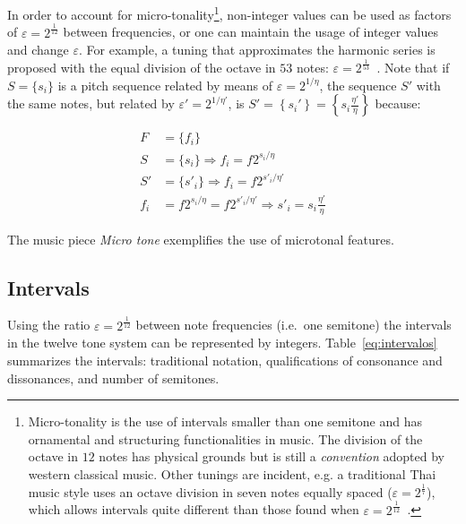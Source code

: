 \documentclass[format=acmsmall, review=false, screen=true]{acmart}
\begin{document}
In order to account for micro-tonality\footnote{Micro-tonality is the use of intervals smaller
than one semitone and has ornamental and structuring functionalities in music. The division of the octave in $12$ notes has physical grounds but is still a \emph{convention} adopted by western classical music. Other tunings are incident, e.g. a traditional Thai music style uses an octave division in seven notes equally spaced ($\varepsilon=2^{\frac{1}{7}}$),
which allows intervals quite different than those found when $\varepsilon=2^{\frac{1}{12}}$~\cite{Wisnick}.}, non-integer values can be used as factors of $\varepsilon=2^{\frac{1}{12}}$ between frequencies, or one can maintain the usage of integer values and change $\varepsilon$. For example, a tuning that approximates the harmonic series
is proposed with the equal division of the octave in $53$ notes:
$\varepsilon=2^{\frac{1}{53}}$~\cite{microtonalidade}.
Note that if $S=\{s_i\}$ is a pitch sequence related by means of $\varepsilon=2^{1/\eta}$, the sequence $S'$ with the same notes, but related by $\varepsilon'=2^{1/\eta'}$, is 
$S'=\left\{s_i'\right\}=\left\{
s_i \frac{\eta'}{\eta}\right\}$ because:

\begin{equation}\label{eq:micro}
\begin{split}
    F   & = \{f_i\}\\
    S   & = \{s_i\} \Rightarrow f_i = f 2^{s_i/\eta}\\
    S'  & = \{s'_i\} \Rightarrow f_i = f 2^{s'_i/\eta'}\\
    f_i & =  f 2^{s_i/\eta} = f 2^{s'_i/\eta'} \Rightarrow s'_i = s_i\frac{\eta'}{\eta} 
\end{split}
\end{equation}

The music piece \emph{Micro
tone} exemplifies the use of microtonal features.

\subsection{Intervals}\label{subsec:intervalos}
Using the ratio $\varepsilon=2^{\frac{1}{12}}$ between note frequencies (i.e.\ one semitone)
the intervals in the twelve tone system can be represented by integers. Table~\ref{eq:intervalos} summarizes the intervals: traditional notation, qualifications of consonance and
dissonances, and number of semitones.
\end{document}
